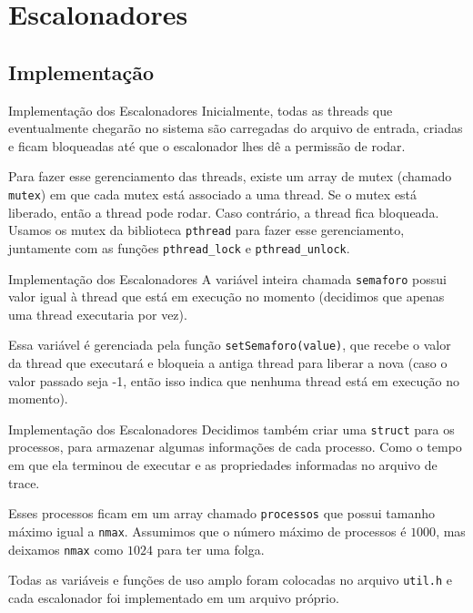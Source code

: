 \documentclass[10pt]{beamer}
\begin{document}
    \section{Escalonadores}
    \subsection{Implementação}
    \begin{frame}{Implementação dos Escalonadores}
    Inicialmente, todas as threads que eventualmente chegarão no sistema são carregadas do arquivo de entrada, criadas e ficam bloqueadas até que o escalonador lhes dê a permissão de rodar.

    Para fazer esse gerenciamento das threads, existe um array de mutex (chamado \texttt{mutex}) em
        que cada mutex está associado a uma thread. Se o mutex está liberado, então a thread pode
        rodar. Caso contrário, a thread fica bloqueada. Usamos os mutex da biblioteca
        \texttt{pthread} para fazer esse gerenciamento, juntamente com as funções \texttt{pthread\_lock} e \texttt{pthread\_unlock}.
    \end{frame}
    \begin{frame}{Implementação dos Escalonadores}
        A variável inteira chamada \texttt{semaforo} possui valor igual à thread que está em execução no momento (decidimos que apenas uma thread executaria por vez).

        Essa variável é gerenciada pela função \texttt{setSemaforo(value)},
        que recebe o valor da thread que executará e bloqueia a antiga
        thread para liberar a nova (caso o valor passado seja -1,
        então isso indica que nenhuma thread está em execução no momento).
    \end{frame}

    \begin{frame}{Implementação dos Escalonadores}
        Decidimos também criar uma \texttt{struct} para os processos, para
        armazenar algumas informações de cada processo. Como o tempo em que ela terminou
        de executar e as propriedades informadas no arquivo de trace.

        Esses processos ficam em um array chamado \texttt{processos} que possui tamanho
        máximo igual a \texttt{nmax}. Assumimos que o número máximo de processos é
        $1000$, mas deixamos \texttt{nmax} como $1024$ para ter uma folga.

        Todas as variáveis e funções de uso amplo foram colocadas no arquivo
        \texttt{util.h} e cada escalonador foi implementado em um arquivo próprio.        
    \end{frame}
\end{document}
